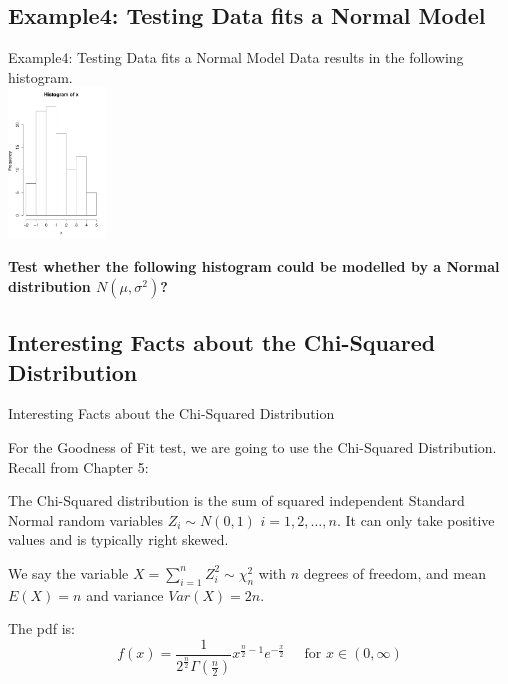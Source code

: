 \documentclass[t,xcolor=pdftex,dvipsnames,table]{beamer}\usepackage[]{graphicx}\usepackage[]{color}
\begin{document}
\subsection[GoodnessofFit]{Example4: Testing Data fits a Normal Model}
\begin{frame}[fragile]{Example4: Testing Data fits a Normal Model}
Data results in the following histogram. \\



\includegraphics[height=4cm]{../images/Topic11_Q2.pdf}

\vspace{.5cm}
{\bf Test whether the following histogram could be modelled by a Normal distribution $N(\mu, \sigma^2)$?}
\end{frame}

\subsection[GoodnessofFit]{Interesting Facts about the Chi-Squared Distribution}

\begin{frame}[fragile]{Interesting Facts about the Chi-Squared Distribution}

For the Goodness of Fit test, we are going to use the 
Chi-Squared Distribution. Recall from Chapter 5:

\begin{definition}
The \alert{Chi-Squared distribution} is the sum of squared independent Standard Normal random variables $Z_{i} \sim N(0,1)$ $i=1,2,\ldots,n$. It can only take positive values and is typically right skewed.

\vspace{.5cm}
We say the variable $X = \sum_{i=1}^{n} Z_{i}^2 \sim \chi^2_{n}$ with $n$ degrees of freedom, and mean $E(X)=n$ and  variance $Var(X) = 2n$.

\vspace{.5cm}
The pdf is:
\[ f(x)  =  \frac{ 1}  { 2^{\frac{n}{2}} \Gamma(\frac{n}{2})}
x^{\frac{n}{2}-1} e^{-\frac{x}{2}}
\;\;\;\;\; \mbox{for }  x \in (0, \infty) \]

\end{definition}
\href{https://www.youtube.com/watch?v=hcDb12fsbBU}{}

\end{frame}
\end{document}
